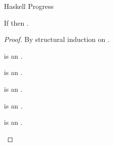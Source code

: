 \begin{theorem}{Haskell Progress}

\label{thmpsh}

If \judeh{}{\first{\varexph}}{\vartyh} then \pshyp{\first{\varexph}}{\second{\varexph}}.

\begin{proof}

By structural induction on \first{\varexph}.


\newcommand{\psfabss}{\expfabss{\varvarh}{\vartyh}{\varexph}\xspace}

\begin{case}{\psfabss}

\psfabss is an \prouv.

\end{case}


\newcommand{\pstabs}{\exptabs{\tyvarh}{\varexph}\xspace}

\begin{case}{\pstabs}

\pstabs is an \prouv.

\end{case}


\newcommand{\psnum}{\expnum{\symnum}\xspace}

\begin{case}{\psnum}

\psnum is an \prouv.

\end{case}


\newcommand{\psnils}{\expnils{\vartyh}\xspace}

\begin{case}{\psnils}

\psnils is an \prouv.

\end{case}


\newcommand{\psconsh}{\expcons{\first{\varexph}}{\second{\varexph}}\xspace}

\begin{case}{\psconsh}

\psconsh is an \prouv.

\end{case}



\end{proof}
\end{theorem}
